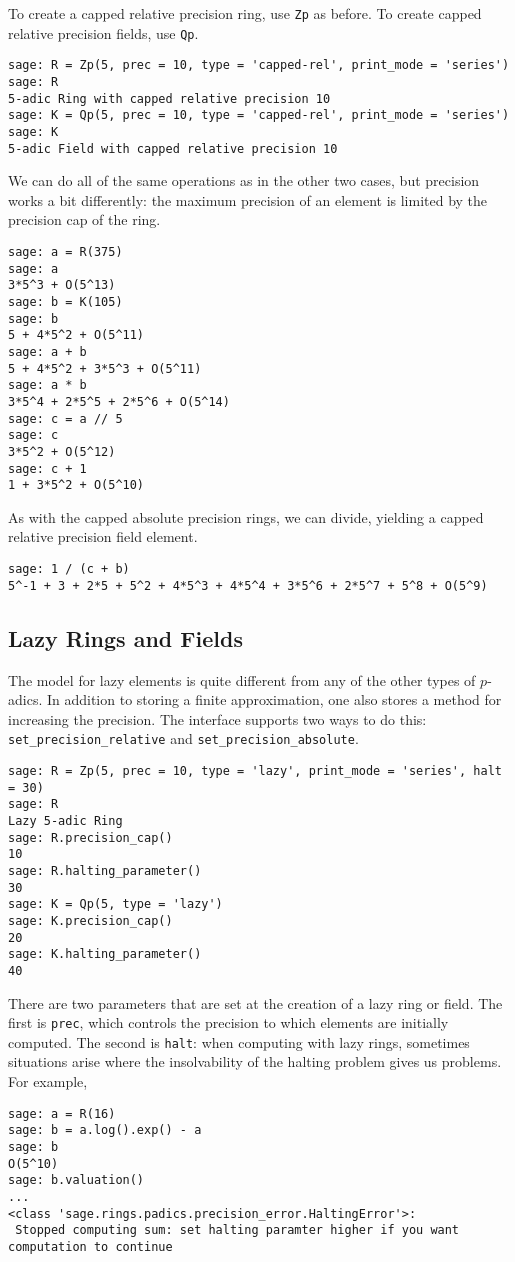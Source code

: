 \documentclass[12pt]{article}
\begin{document}
To create a capped relative precision ring, use \verb/Zp/ as before.  To create capped relative precision fields, use
\verb/Qp/.
\begin{verbatim}
sage: R = Zp(5, prec = 10, type = 'capped-rel', print_mode = 'series')
sage: R
5-adic Ring with capped relative precision 10
sage: K = Qp(5, prec = 10, type = 'capped-rel', print_mode = 'series')
sage: K
5-adic Field with capped relative precision 10
\end{verbatim}

We can do all of the same operations as in the other two cases, but precision works a bit differently:
the maximum precision of an element is limited by the precision cap of the ring.
\begin{verbatim}
sage: a = R(375)
sage: a
3*5^3 + O(5^13)
sage: b = K(105)
sage: b
5 + 4*5^2 + O(5^11)
sage: a + b
5 + 4*5^2 + 3*5^3 + O(5^11)
sage: a * b
3*5^4 + 2*5^5 + 2*5^6 + O(5^14)
sage: c = a // 5
sage: c
3*5^2 + O(5^12)
sage: c + 1
1 + 3*5^2 + O(5^10)
\end{verbatim}

As with the capped absolute precision rings, we can divide, yielding a capped relative precision field element.
\begin{verbatim}
sage: 1 / (c + b)
5^-1 + 3 + 2*5 + 5^2 + 4*5^3 + 4*5^4 + 3*5^6 + 2*5^7 + 5^8 + O(5^9)
\end{verbatim}

\subsection{Lazy Rings and Fields}
The model for lazy elements is quite different from any of the other types of $p$-adics.
In addition to storing a finite approximation, one also stores a method for increasing
the precision.  The interface supports two ways to do this: \verb/set_precision_relative/ and 
\verb/set_precision_absolute/.

\begin{verbatim}
sage: R = Zp(5, prec = 10, type = 'lazy', print_mode = 'series', halt = 30)
sage: R
Lazy 5-adic Ring
sage: R.precision_cap()
10
sage: R.halting_parameter()
30
sage: K = Qp(5, type = 'lazy')
sage: K.precision_cap()
20
sage: K.halting_parameter()
40
\end{verbatim}

There are two parameters that are set at the creation of a lazy ring or field.  The first is \verb/prec/, which
controls the precision to which elements are initially computed.  The second is \verb/halt/: when computing with lazy rings, sometimes situations
arise where the insolvability of the halting problem gives us problems.  For example,
\begin{verbatim}
sage: a = R(16)
sage: b = a.log().exp() - a
sage: b
O(5^10)
sage: b.valuation()
...
<class 'sage.rings.padics.precision_error.HaltingError'>:
 Stopped computing sum: set halting paramter higher if you want computation to continue
\end{verbatim}
\end{document}
